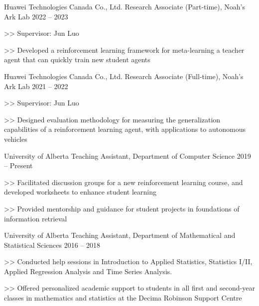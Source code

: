 \begin{cventries}
  \cventry
    {Huawei Technologies Canada Co., Ltd.}
    {Research Associate (Part-time), Noah's Ark Lab}
    {2022 -- 2023}
    {
      \begin{cvitems}
        \item[>>] Supervisor: Jun Luo
        \item[>>] Developed a reinforcement learning framework for meta-learning a teacher agent that can quickly train new student agents
      \end{cvitems}
    }

  \cventry
    {Huawei Technologies Canada Co., Ltd.}
    {Research Associate (Full-time), Noah's Ark Lab}
    {2021 -- 2022}
    {
      \begin{cvitems}
        \item[>>] Supervisor: Jun Luo
        \item[>>] Designed evaluation methodology for measuring the generalization capabilities of a reinforcement learning agent, with applications to autonomous vehicles
      \end{cvitems}
    }

  \cventry
    {University of Alberta}
    {Teaching Assistant, Department of Computer Science}
    {2019 -- Present}
    {
      \begin{cvitems}
        \item[>>] Facilitated discussion groups for a new reinforcement learning course, and developed worksheets to enhance student learning
        \item[>>] Provided mentorship and guidance for student projects in foundations of information retrieval
      \end{cvitems}
    }


  \cventry
    {University of Alberta}
    {Teaching Assistant, Department of Mathematical and Statistical Sciences} {2016 -- 2018}
    {
      \begin{cvitems}
        \item[>>] Conducted help sessions in Introduction to Applied Statistics, Statistics I/II, Applied Regression Analysis and Time Series Analysis.
        \item[>>] Offered personalized academic support to students in all first and second-year classes in mathematics and statistics at the Decima Robinson Support Centre
      \end{cvitems}
    }


\end{cventries}
